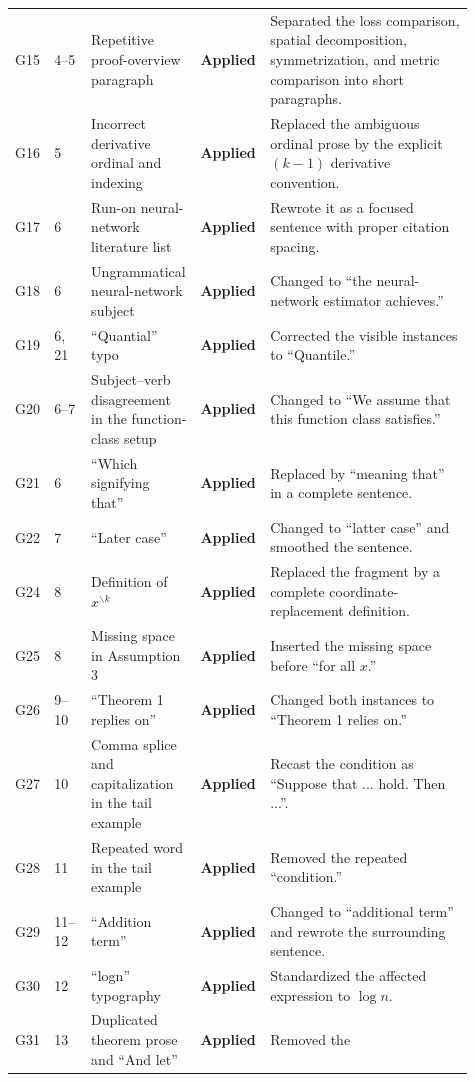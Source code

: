 \documentclass[10pt]{article}
\newcommand{\applied}{\textcolor{appliedgreen}{\textbf{Applied}}}
\begin{document}
\begin{landscape}
\begin{longtable}{L{0.045\linewidth}L{0.08\linewidth}L{0.21\linewidth}L{0.13\linewidth}L{0.445\linewidth}}
G15 & 4--5 & Repetitive proof-overview paragraph & \applied &
Separated the loss comparison, spatial decomposition, symmetrization, and
metric comparison into short paragraphs.\\
G16 & 5 & Incorrect derivative ordinal and indexing & \applied & Replaced the
ambiguous ordinal prose by the explicit $(k-1)$ derivative convention.\\
G17 & 6 & Run-on neural-network literature list & \applied &
Rewrote it as a focused sentence with proper citation spacing.\\
G18 & 6 & Ungrammatical neural-network subject & \applied & Changed to ``the
neural-network estimator achieves.''\\
G19 & 6, 21 & ``Quantial'' typo & \applied & Corrected the visible
instances to ``Quantile.''\\
G20 & 6--7 & Subject--verb disagreement in the function-class setup & \applied &
Changed to ``We assume that this function class satisfies.''\\
G21 & 6 & ``Which signifying that'' & \applied & Replaced by
``meaning that'' in a complete sentence.\\
G22 & 7 & ``Later case'' & \applied & Changed to ``latter case'' and smoothed the
sentence.\\
G24 & 8 & Definition of $x^{\backslash k}$ & \applied & Replaced
the fragment by a complete coordinate-replacement definition.\\
G25 & 8 & Missing space in Assumption 3 & \applied & Inserted the missing space
before ``for all $x$.''\\
G26 & 9--10 & ``Theorem 1 replies on'' & \applied & Changed both
instances to ``Theorem 1 relies on.''\\
G27 & 10 & Comma splice and capitalization in the tail example & \applied & Recast
the condition as ``Suppose that ... hold. Then ...''.\\
G28 & 11 & Repeated word in the tail example & \applied & Removed
the repeated ``condition.''\\
G29 & 11--12 & ``Addition term'' & \applied & Changed to ``additional term'' and
rewrote the surrounding sentence.\\
G30 & 12 & ``logn'' typography & \applied & Standardized the
affected expression to $\log n$.\\
G31 & 13 & Duplicated theorem prose and ``And let'' & \applied & Removed the

\end{longtable}
\end{landscape}
\end{document}
